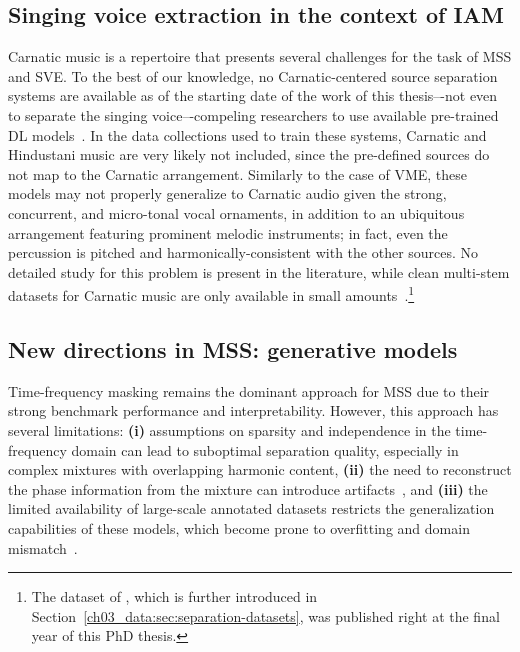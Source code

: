 \subsection{Singing voice extraction in the context of IAM}
Carnatic music is a repertoire that presents several challenges for the task of \acrshort{MSS} and \acrshort{SVE}. To the best of our knowledge, no Carnatic-centered source separation systems are available as of the starting date of the work of this thesis–-not even to separate the singing voice–-compeling researchers to use available pre-trained \acrshort{DL} models~\citep{nuttall-matrix,shah-raga_recognition,clayton-raga_classification}. In the data collections used to train these systems, Carnatic and Hindustani music are very likely not included, since the pre-defined sources do not map to the Carnatic arrangement. Similarly to the case of \acrshort{VME}, these models may not properly generalize to Carnatic audio given the strong, concurrent, and micro-tonal vocal ornaments, in addition to an ubiquitous arrangement featuring prominent melodic instruments; in fact, even the percussion is pitched and harmonically-consistent with the other sources. No detailed study for this problem is present in the literature, while clean multi-stem datasets for Carnatic music are only available in small amounts~\citep{sanidha-multimodal}.\footnote{The dataset of \citep{sanidha-multimodal}, which is further introduced in Section~\ref{ch03_data:sec:separation-datasets}, was published right at the final year of this PhD thesis.}



\subsection{New directions in MSS: generative models}
\label{ch02_sb:sec:future-directions-mss}
Time-frequency masking remains the dominant approach for \acrshort{MSS} due to their strong benchmark performance and interpretability. However, this approach has several limitations: \textbf{(i)} assumptions on sparsity and independence in the time-frequency domain can lead to suboptimal separation quality, especially in complex mixtures with overlapping harmonic content, \textbf{(ii)} the need to reconstruct the phase information from the mixture can introduce artifacts~\citep{defossez-demucs_waveform}, and \textbf{(iii)} the limited availability of large-scale annotated datasets restricts the generalization capabilities of these models, which become prone to overfitting and domain mismatch~\citep{bugler-transfer_separation}.

